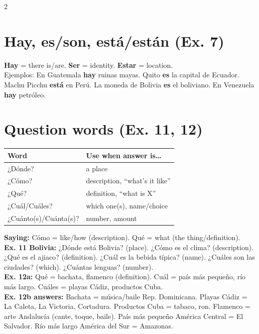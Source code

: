 \documentclass[9pt,a4paper]{article}
\begin{document}
\begin{multicols}{2}
\section*{\color{spanishgreen}Hay, es/son, est\'a/est\'an (Ex. 7)}
\textbf{Hay} = there is/are. \textbf{Ser} = identity. \textbf{Estar} = location. \\
Ejemplos: En Guatemala \textbf{hay} ruinas mayas. Quito \textbf{es} la capital de Ecuador. Machu Picchu \textbf{est\'a} en Per\'u. La moneda de Bolivia \textbf{es} el boliviano. En Venezuela \textbf{hay} petr\'oleo.

\section*{\color{spanishgreen}Question words (Ex. 11, 12)}
\begin{center}\footnotesize
\begin{tabular}{@{}ll@{}}
\toprule
\textbf{Word} & \textbf{Use when answer is\ldots} \\
\midrule
¿D\'onde? & a place \\
¿C\'omo? & description, ``what's it like'' \\
¿Qu\'e? & definition, ``what is X'' \\
¿Cu\'al/Cu\'ales? & which one(s), name/choice \\
¿Cu\'anto(s)/Cu\'anta(s)? & number, amount \\
\bottomrule
\end{tabular}
\end{center}
\textbf{Saying:} C\'omo = like/how (description). Qu\'e = what (the thing/definition). \\
\textbf{Ex. 11 Bolivia:} ¿D\'onde est\'a Bolivia? (place). ¿C\'omo es el clima? (description). ¿Qu\'e es el ajiaco? (definition). ¿Cu\'al es la bebida t\'ipica? (name). ¿Cu\'ales son las ciudades? (which). ¿Cu\'antas lenguas? (number). \\
\textbf{Ex. 12a:} Qu\'e = bachata, flamenco (definition). Cu\'al = pa\'is m\'as peque\~no, r\'io m\'as largo. Cu\'ales = playas C\'adiz, productos Cuba. \\
\textbf{Ex. 12b answers:} Bachata = m\'usica/baile Rep. Dominicana. Playas C\'adiz = La Caleta, La Victoria, Cortadura. Productos Cuba = tabaco, ron. Flamenco = arte Andaluc\'ia (cante, toque, baile). Pa\'is m\'as peque\~no Am\'erica Central = El Salvador. R\'io m\'as largo Am\'erica del Sur = Amazonas.


\end{multicols}
\end{document}
